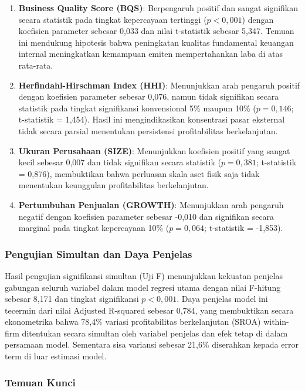 \documentclass[12pt,a4paper]{article}
\providecommand{\tightlist}{%
  \setlength{\itemsep}{0pt}\setlength{\parskip}{0pt}%
}
\begin{document}
\begin{enumerate}
\def\labelenumi{\arabic{enumi}.}
\tightlist
\item
  \textbf{Business Quality Score (BQS)}: Berpengaruh positif dan sangat
  signifikan secara statistik pada tingkat kepercayaan tertinggi
  (\(p < 0,001\)) dengan koefisien parameter sebesar 0,033 dan nilai
  t-statistik sebesar 5,347. Temuan ini mendukung hipotesis bahwa
  peningkatan kualitas fundamental keuangan internal meningkatkan
  kemampuan emiten mempertahankan laba di atas rata-rata.
\item
  \textbf{Herfindahl-Hirschman Index (HHI)}: Menunjukkan arah pengaruh
  positif dengan koefisien parameter sebesar 0,076, namun tidak
  signifikan secara statistik pada tingkat signifikansi konvensional 5\%
  maupun 10\% (\(p = 0,146\); t-statistik = 1,454). Hasil ini
  mengindikasikan konsentrasi pasar eksternal tidak secara parsial
  menentukan persistensi profitabilitas berkelanjutan.
\item
  \textbf{Ukuran Perusahaan (SIZE)}: Menunjukkan koefisien positif yang
  sangat kecil sebesar 0,007 dan tidak signifikan secara statistik
  (\(p = 0,381\); t-statistik = 0,876), membuktikan bahwa perluasan
  skala aset fisik saja tidak menentukan keunggulan profitabilitas
  berkelanjutan.
\item
  \textbf{Pertumbuhan Penjualan (GROWTH)}: Menunjukkan arah pengaruh
  negatif dengan koefisien parameter sebesar -0,010 dan signifikan
  secara marginal pada tingkat kepercayaan 10\% (\(p = 0,064\);
  t-statistik = -1,853).
\end{enumerate}

\subsubsection{Pengujian Simultan dan Daya
Penjelas}\label{pengujian-simultan-dan-daya-penjelas}

Hasil pengujian signifikansi simultan (Uji F) menunjukkan kekuatan
penjelas gabungan seluruh variabel dalam model regresi utama dengan
nilai F-hitung sebesar 8,171 dan tingkat signifikansi \(p < 0,001\).
Daya penjelas model ini tecermin dari nilai Adjusted R-squared sebesar
0,784, yang membuktikan secara ekonometrika bahwa 78,4\% variasi
profitabilitas berkelanjutan (SROA) within-firm ditentukan secara
simultan oleh variabel penjelas dan efek tetap di dalam persamaan model.
Sementara sisa variansi sebesar 21,6\% diserahkan kepada error term di
luar estimasi model.

\subsubsection{Temuan Kunci}\label{temuan-kunci}
\end{document}
